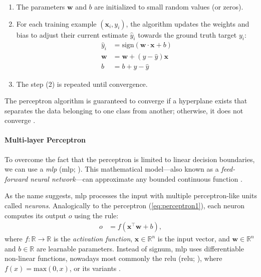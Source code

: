 \begin{enumerate}
    \item The parameters $\textbf{w}$ and $b$ are initialized to small random values (or zeros).
    \item For each training example $(\mathbf{x}_i, y_i)$, the algorithm updates the weights and bias to adjust their current estimate $\hat{y}_i$ towards the ground truth target $y_i$:
          \begin{align} \label{eq:perceptron1}
              \hat{y}_i  & = \text{sign}(\textbf{w} \cdot \mathbf{x} + b) \\
              \textbf{w} & = \textbf{w} + (y - \hat{y}) \textbf{x}        \\
              b          & = b + y - \hat{y}
          \end{align}
    \item The step (2) is repeated until convergence.
\end{enumerate}

The perceptron algorithm is guaranteed to converge if a hyperplane exists that separates the data belonging to one class from another; otherwise, it does not converge \cite{novikoff1962convergence}.

\paragraph{Multi-layer Perceptron} To overcome the fact that the perceptron is limited to linear decision boundaries, we can use a \emph{\acl{mlp}} (\acs{mlp}; \citealp[p.~164]{goodfellow2016deep}). This mathematical model---also known as a \emph{feed-forward neural network}---can approximate any bounded continuous function \cite{hornik1989multilayer}.

As the name suggests, \ac{mlp} processes the input with multiple perceptron-like units called \textit{neurons}. Analogically to the perceptron (\autoref{eq:perceptron1}), each neuron computes its output $o$ using the rule:
\begin{align}
    o & = f(\mathbf{x}^\top \mathbf{w}  + b),
\end{align}
where $f: \mathbb{R} \rightarrow \mathbb{R}$ is the \emph{activation function}, $\mathbf{x}\in \mathbb{R}^n$ is the input vector, and $\mathbf{w} \in \mathbb{R}^n$ and $b \in \mathbb{R}$ are learnable parameters. Instead of signum, \ac{mlp} uses differentiable non-linear functions, nowadays most commonly the \acl{relu} (\acs{relu}; \citealp{nair2010rectified}), where $f(x) = \text{max}(0, x)$, or its variants \cite{hendrycks2016gaussian,dubey2022activation}.

